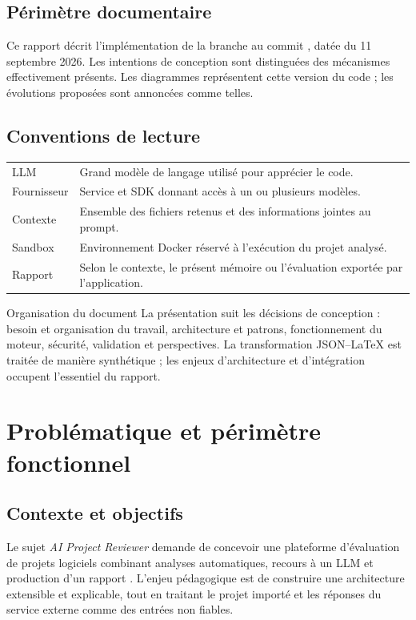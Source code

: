 \subsection*{Périmètre documentaire}
Ce rapport décrit l'implémentation de la branche  au commit , datée du 11 septembre 2026. Les intentions de conception sont distinguées des mécanismes effectivement présents. Les diagrammes représentent cette version du code ; les évolutions proposées sont annoncées comme telles.

\subsection*{Conventions de lecture}
\begin{tabularx}{\textwidth}{@{}P{23mm}Y@{}}
\toprule
{} & \\
\midrule
LLM & Grand modèle de langage utilisé pour apprécier le code.\\
Fournisseur & Service et SDK donnant accès à un ou plusieurs modèles.\\
Contexte & Ensemble des fichiers retenus et des informations jointes au prompt.\\
Sandbox & Environnement Docker réservé à l'exécution du projet analysé.\\
Rapport & Selon le contexte, le présent mémoire ou l'évaluation exportée par l'application.\\
\bottomrule
\end{tabularx}

\clearpage
\tableofcontents
\vfill
\begin{pointcle}{Organisation du document}
La présentation suit les décisions de conception : besoin et organisation du travail, architecture et patrons, fonctionnement du moteur, sécurité, validation et perspectives. La transformation JSON--LaTeX est traitée de manière synthétique ; les enjeux d'architecture et d'intégration occupent l'essentiel du rapport.
\end{pointcle}
\clearpage

\section{Problématique et périmètre fonctionnel}
\label{sec:besoin}
\subsection{Contexte et objectifs}
Le sujet \emph{AI Project Reviewer} demande de concevoir une plateforme d'évaluation de projets logiciels combinant analyses automatiques, recours à un LLM et production d'un rapport \cite{sujet}. L'enjeu pédagogique est de construire une architecture extensible et explicable, tout en traitant le projet importé et les réponses du service externe comme des entrées non fiables.

